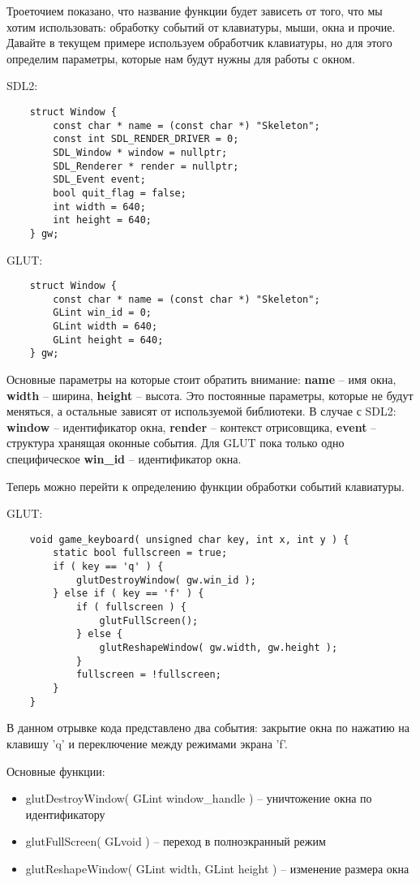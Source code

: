 Троеточием показано, что название функции будет зависеть от того, что мы хотим использовать: обработку 
событий от клавиатуры, мыши, окна и прочие. Давайте в текущем примере используем обработчик клавиатуры, но 
для этого определим параметры, которые нам будут нужны для работы с окном.

SDL2:
\begin{lstlisting}
    struct Window {
        const char * name = (const char *) "Skeleton";
        const int SDL_RENDER_DRIVER = 0;
        SDL_Window * window = nullptr;
        SDL_Renderer * render = nullptr;
        SDL_Event event;
        bool quit_flag = false;
        int width = 640;
        int height = 640;
    } gw;
\end{lstlisting}

GLUT:
\begin{lstlisting}
    struct Window {
        const char * name = (const char *) "Skeleton";
        GLint win_id = 0;
        GLint width = 640;
        GLint height = 640;
    } gw;
\end{lstlisting}

Основные параметры на которые стоит обратить внимание: \textbf{name} -- имя окна, \textbf{width} -- ширина, 
\textbf{height} -- высота. Это постоянные параметры, которые не будут меняться, а остальные зависят от используемой библиотеки. 
В случае с SDL2: \textbf{window} -- идентификатор окна, \textbf{render} -- контекст отрисовщика, \textbf{event} -- структура 
хранящая оконные события. Для GLUT пока только одно специфическое \textbf{win\_id} -- идентификатор окна.

Теперь можно перейти к определению функции обработки событий клавиатуры.

GLUT:
\begin{lstlisting}
    void game_keyboard( unsigned char key, int x, int y ) {
        static bool fullscreen = true;
        if ( key == 'q' ) {
            glutDestroyWindow( gw.win_id );
        } else if ( key == 'f' ) {
            if ( fullscreen ) {
                glutFullScreen();
            } else {
                glutReshapeWindow( gw.width, gw.height );
            }
            fullscreen = !fullscreen;
        }
    }
\end{lstlisting}

В данном отрывке кода представлено два события: закрытие окна по нажатию на клавишу 'q' и переключение между 
режимами экрана 'f'.

Основные функции:
\begin{itemize}
    \item glutDestroyWindow( GLint window\_handle ) -- уничтожение окна по идентификатору
    \item glutFullScreen( GLvoid ) -- переход в полноэкранный режим
    \item glutReshapeWindow( GLint width, GLint height ) -- изменение размера окна
\end{itemize}

